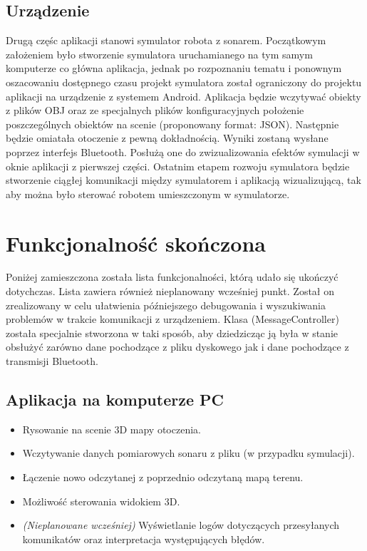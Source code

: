 \documentclass[a4paper,12pt]{article}
\begin{document}
\subsection{Urządzenie} 
Drugą częśc aplikacji stanowi symulator robota z sonarem. Początkowym założeniem było stworzenie symulatora uruchamianego
na tym samym komputerze co główna aplikacja, jednak po rozpoznaniu tematu i ponownym oszacowaniu dostępnego czasu projekt symulatora
został ograniczony do projektu aplikacji na urządzenie z systemem Android.
Aplikacja będzie wczytywać obiekty z plików OBJ oraz ze specjalnych plików konfiguracyjnych
położenie poszczególnych obiektów na scenie (proponowany format: JSON). Następnie będzie
omiatała otoczenie z pewną dokładnością. Wyniki zostaną wysłane poprzez interfejs Bluetooth. Posłużą one
do zwizualizowania efektów symulacji w oknie aplikacji z pierwszej części. 
Ostatnim etapem rozwoju symulatora będzie stworzenie ciągłej komunikacji między symulatorem i aplikacją
wizualizującą, tak aby można było sterować robotem umieszczonym w symulatorze.

\section{Funkcjonalność skończona}
Poniżej zamieszczona została lista funkcjonalności, którą udało się ukończyć dotychczas. Lista zawiera również nieplanowany wcześniej punkt. 
Został on zrealizowany w celu ułatwienia późniejszego debugowania i wyszukiwania problemów w trakcie komunikacji z urządzeniem. Klasa (MessageController)
została specjalnie stworzona w taki sposób, aby dziedzicząc ją była w stanie obsłużyć zarówno dane pochodzące z pliku dyskowego jak i dane pochodzące z 
transmisji Bluetooth. 
\subsection{Aplikacja na komputerze PC}
\begin{itemize}
\item Rysowanie na scenie 3D mapy otoczenia.
\item Wczytywanie danych pomiarowych sonaru z pliku (w przypadku symulacji).
\item Łączenie nowo odczytanej z poprzednio odczytaną mapą terenu. 
\item Możliwość sterowania widokiem 3D.
\item \textit{ (Nieplanowane wcześniej) }Wyświetlanie logów dotyczących przesyłanych komunikatów oraz interpretacja występujących błędów.
\end{itemize}
\end{document}
